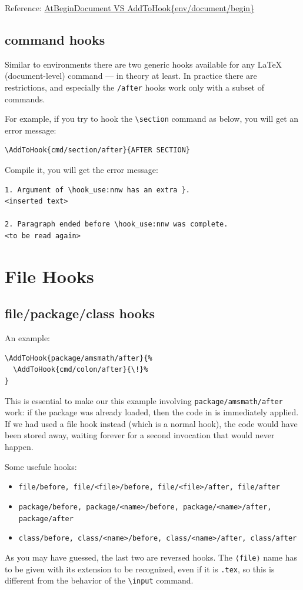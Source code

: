 \documentclass{article}
\newcommand\tbh{\textbackslash}
\begin{document}
Reference: \href{https://tex.stackexchange.com/a/653536/294585}{AtBeginDocument VS AddToHook\{env/document/begin\}}

\subsection{command hooks}
Similar to environments there are two generic hooks available for any \LaTeX{} (document-level) command — in theory at least. 
In practice there are restrictions, and especially the \texttt{/after} hooks work only with a subset of commands.

For example, if you try to hook the \verb|\section| command as below, you will get an error message:
\begin{lstlisting}
\AddToHook{cmd/section/after}{AFTER SECTION}
\end{lstlisting}

Compile it, you will get the error message:
\begin{lstlisting}
1. Argument of \hook_use:nnw has an extra }.
<inserted text>

2. Paragraph ended before \hook_use:nnw was complete.
<to be read again>
\end{lstlisting}

\section{File Hooks}
\subsection{file/package/class hooks}
An example:
\begin{lstlisting}
\AddToHook{package/amsmath/after}{%
  \AddToHook{cmd/colon/after}{\!}%
}
\end{lstlisting}
This is essential to make our this example involving \texttt{package/amsmath/after} work: if
the package was already loaded, then the code in \AddToHook is immediately applied.
If we had used a file hook instead (which is a normal hook), the code would have
been stored away, waiting forever for a second invocation that would never happen.

Some usefule hooks:
\begin{itemize}
  \item \texttt{file/before, file/<file>/before, file/<file>/after, file/after}
  \item \texttt{package/before, package/<name>/before, package/<name>/after, package/after}
  \item \texttt{class/before, class/<name>/before, class/<name>/after, class/after}
\end{itemize}
As you may have guessed, the last two
are reversed hooks. The \texttt{⟨file⟩} name has to be given with its extension to be recognized,
even if it is \texttt{.tex}, so this is different from the behavior of the \texttt{\tbh input} command.
\end{document}
